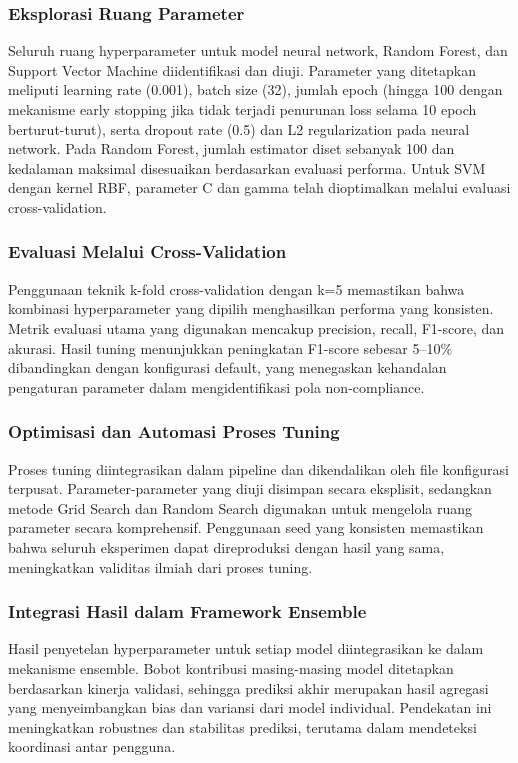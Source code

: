 \subsubsection{Eksplorasi Ruang Parameter}
Seluruh ruang hyperparameter untuk model neural network, Random Forest, dan Support Vector Machine diidentifikasi dan diuji. Parameter yang ditetapkan meliputi learning rate (0.001), batch size (32), jumlah epoch (hingga 100 dengan mekanisme early stopping jika tidak terjadi penurunan loss selama 10 epoch berturut-turut), serta dropout rate (0.5) dan L2 regularization pada neural network. Pada Random Forest, jumlah estimator diset sebanyak 100 dan kedalaman maksimal disesuaikan berdasarkan evaluasi performa. Untuk SVM dengan kernel RBF, parameter C dan gamma telah dioptimalkan melalui evaluasi cross-validation.

\subsubsection{Evaluasi Melalui Cross-Validation}
Penggunaan teknik k-fold cross-validation dengan k=5 memastikan bahwa kombinasi hyperparameter yang dipilih menghasilkan performa yang konsisten. Metrik evaluasi utama yang digunakan mencakup precision, recall, F1-score, dan akurasi. Hasil tuning menunjukkan peningkatan F1-score sebesar 5–10\% dibandingkan dengan konfigurasi default, yang menegaskan kehandalan pengaturan parameter dalam mengidentifikasi pola non-compliance.

\subsubsection{Optimisasi dan Automasi Proses Tuning}
Proses tuning diintegrasikan dalam pipeline dan dikendalikan oleh file konfigurasi terpusat. Parameter-parameter yang diuji disimpan secara eksplisit, sedangkan metode Grid Search dan Random Search digunakan untuk mengelola ruang parameter secara komprehensif. Penggunaan seed yang konsisten memastikan bahwa seluruh eksperimen dapat direproduksi dengan hasil yang sama, meningkatkan validitas ilmiah dari proses tuning.

\subsubsection{Integrasi Hasil dalam Framework Ensemble}
Hasil penyetelan hyperparameter untuk setiap model diintegrasikan ke dalam mekanisme ensemble. Bobot kontribusi masing-masing model ditetapkan berdasarkan kinerja validasi, sehingga prediksi akhir merupakan hasil agregasi yang menyeimbangkan bias dan variansi dari model individual. Pendekatan ini meningkatkan robustnes dan stabilitas prediksi, terutama dalam mendeteksi koordinasi antar pengguna.

